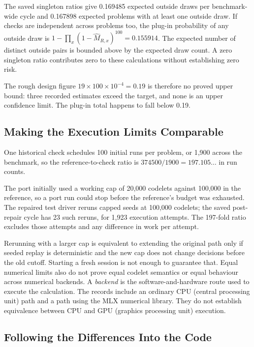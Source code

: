 \documentclass[10pt,letterpaper]{article}
\begin{document}
The saved singleton ratios give 0.169485 expected outside draws per benchmark-wide cycle
and 0.167898 expected problems with at least one outside draw. If checks are independent
across problems too, the plug-in probability of any outside draw is \(1-\prod_x(1-\widehat
M_{R,x})^{100}=0.155914\). The expected number of distinct outside pairs is bounded above
by the expected draw count. A zero singleton ratio contributes zero to these calculations
without establishing zero risk.

The rough design figure \(19\times100\times10^{-4}=0.19\) is therefore no proved upper
bound: three recorded estimates exceed the target, and none is an upper confidence limit.
The plug-in total happens to fall below 0.19.

\subsection{Making the Execution Limits Comparable}\label{sec:cost}

One historical check schedules 100 initial runs per problem, or 1,900 across the
benchmark, so the reference-to-check ratio is \(374500/1900=197.105\ldots\) in run counts.

The port initially used a working cap of 20,000 codelets against 100,000 in the reference,
so a port run could stop before the reference's budget was exhausted. The repaired test
driver reruns capped seeds at 100,000 codelets; the saved post-repair cycle has 23 such
reruns, for 1,923 execution attempts. The 197-fold ratio excludes those attempts and any
difference in work per attempt.

Rerunning with a larger cap is equivalent to extending the original path only if seeded
replay is deterministic and the new cap does not change decisions before the old cutoff.
Starting a fresh session is not enough to guarantee that. Equal numerical limits also do
not prove equal codelet semantics or equal behaviour across numerical backends. A
\emph{backend} is the software-and-hardware route used to execute the calculation. The
records include an ordinary CPU (central processing unit) path and a path using the MLX
numerical library. They do not establish equivalence between CPU and GPU (graphics
processing unit) execution.

\subsection{Following the Differences Into the Code}\label{sec:results}
\end{document}
